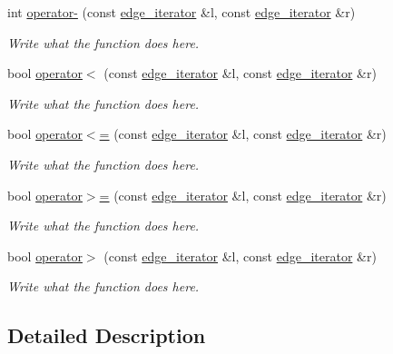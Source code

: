 \begin{DoxyCompactItemize}
int \hyperlink{classgraph_1_1edge__iterator_a85016c8190c146f02194942120d797a2}{operator-\/} (const \hyperlink{classgraph_1_1edge__iterator}{edge\+\_\+iterator} \&l, const \hyperlink{classgraph_1_1edge__iterator}{edge\+\_\+iterator} \&r)
\begin{DoxyCompactList}\small\item\em Write what the function does here. \end{DoxyCompactList}\item 
bool \hyperlink{classgraph_1_1edge__iterator_a23a3dd85c962c0c5a4bf0b30e7696576}{operator$<$} (const \hyperlink{classgraph_1_1edge__iterator}{edge\+\_\+iterator} \&l, const \hyperlink{classgraph_1_1edge__iterator}{edge\+\_\+iterator} \&r)
\begin{DoxyCompactList}\small\item\em Write what the function does here. \end{DoxyCompactList}\item 
bool \hyperlink{classgraph_1_1edge__iterator_a301c07a77180ec86202103484fdfc7eb}{operator$<$=} (const \hyperlink{classgraph_1_1edge__iterator}{edge\+\_\+iterator} \&l, const \hyperlink{classgraph_1_1edge__iterator}{edge\+\_\+iterator} \&r)
\begin{DoxyCompactList}\small\item\em Write what the function does here. \end{DoxyCompactList}\item 
bool \hyperlink{classgraph_1_1edge__iterator_abd25c6fb3a8cc28addbb46e9775ce14c}{operator$>$=} (const \hyperlink{classgraph_1_1edge__iterator}{edge\+\_\+iterator} \&l, const \hyperlink{classgraph_1_1edge__iterator}{edge\+\_\+iterator} \&r)
\begin{DoxyCompactList}\small\item\em Write what the function does here. \end{DoxyCompactList}\item 
bool \hyperlink{classgraph_1_1edge__iterator_afb0a71f83c2fbd013fd42f6a91fdbc99}{operator$>$} (const \hyperlink{classgraph_1_1edge__iterator}{edge\+\_\+iterator} \&l, const \hyperlink{classgraph_1_1edge__iterator}{edge\+\_\+iterator} \&r)
\begin{DoxyCompactList}\small\item\em Write what the function does here. \end{DoxyCompactList}\end{DoxyCompactItemize}


\subsection{Detailed Description}
